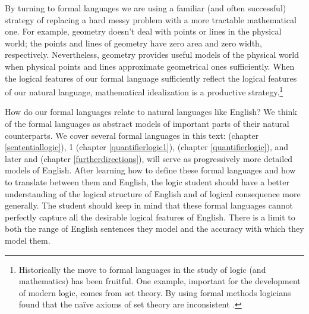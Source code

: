 By turning to formal languages we are using a familiar (and often successful) strategy of replacing a hard messy problem with a more tractable mathematical one. 
For example, geometry doesn't deal with points or lines in the physical world; the points and lines of geometry have zero area and zero width, respectively. 
Nevertheless, geometry provides useful models of the physical world when physical points and lines approximate geometrical ones sufficiently.
When the logical features of our formal language sufficiently reflect the logical features of our natural language, mathematical idealization is a productive strategy.\footnote{%
	Historically the move to formal languages in the study of logic (and mathematics) has been fruitful. 
	One example, important for the development of modern logic, comes from set theory. 
	By using formal methods logicians found that the na\"{i}ve axioms of set theory are inconsistent \citetext{see \citealp{Demopoulos2005} for a quick overview of Russell's paradox, or \citealp[ch~1]{Smullyan2010} for a more careful discussion}.
} 

How do our formal languages relate to natural languages like English?
We think of the formal languages as abstract models of important parts of their natural counterparts. 
We cover several formal languages in this text: \GSL{} (chapter \ref{sententiallogic}), \GQL{}1 (chapter \ref{quantifierlogic1}), \GQL{} (chapter \ref{quantifierlogic}), and later \MGSL{} and \GQLI{} (chapter \ref{furtherdirections}), will serve as progressively more detailed models of English. 
After learning how to define these formal languages and how to translate between them and English, the logic student should have a better understanding of the logical structure of English and of logical consequence more generally.
The student should keep in mind that these formal languages cannot perfectly capture all the desirable logical features of English. 
There is a limit to both the range of English sentences they model and the accuracy with which they model them. 

